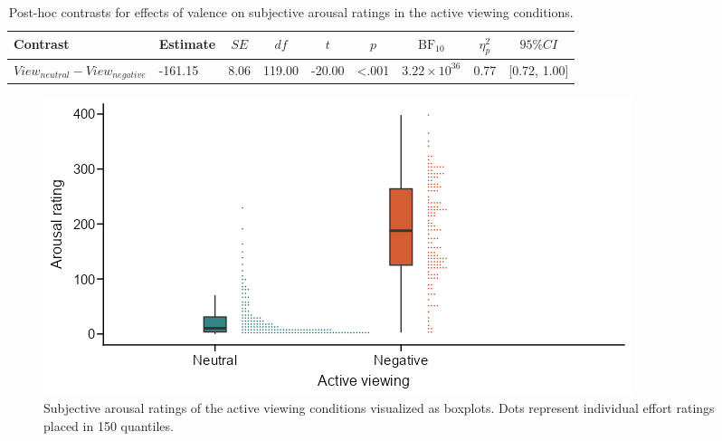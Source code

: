\documentclass[
  man,floatsintext]{apa6}
\begin{document}
\begin{table}[H]

\begin{center}
\begin{threeparttable}

\caption{\label{tab:SupplEffectArousalView}Post-hoc contrasts for effects of valence on subjective arousal ratings in the active viewing conditions.}

\footnotesize{

\begin{tabular}{lllllllll}
\toprule
Contrast & \multicolumn{1}{c}{Estimate} & \multicolumn{1}{c}{$SE$} & \multicolumn{1}{c}{$df$} & \multicolumn{1}{c}{$t$} & \multicolumn{1}{c}{$p$} & \multicolumn{1}{c}{$\mathrm{BF}_{\textrm{10}}$} & \multicolumn{1}{c}{$\eta_{p}^{2}$} & \multicolumn{1}{c}{$95\% CI$}\\
\midrule
$View_{neutral} - View_{negative}$ & -161.15 & 8.06 & 119.00 & -20.00 & <.001 & $3.22 \times 10^{36}$ & 0.77 & {}[0.72, 1.00]\\
\bottomrule
\end{tabular}

}

\end{threeparttable}
\end{center}

\end{table}

\begin{figure}[H]
\includegraphics[width=\textwidth]{figures/FigSubjArousalView} \caption{Subjective arousal ratings of the active viewing conditions visualized as boxplots. Dots represent individual effort ratings placed in 150 quantiles.}\label{fig:SupplFigArousalView}
\end{figure}
\end{document}
